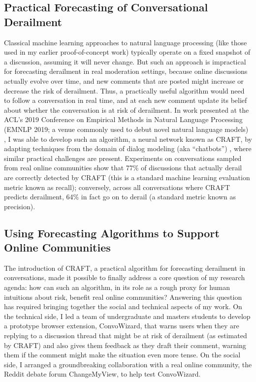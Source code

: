 \documentclass[11pt,letterpaper]{article}
\begin{document}
\subsection{Practical Forecasting of Conversational Derailment}
Classical machine learning approaches to natural language processing (like those used in my earlier proof-of-concept work) typically operate on a fixed snapshot of a discussion, assuming it will never change.
But such an approach is impractical for forecasting derailment in real moderation settings, because online discussions actually evolve over time, and new comments that are posted might increase or decrease the risk of derailment.
Thus, a practically useful algorithm would need to follow a conversation in real time, and at each new comment update its belief about whether the conversation is at risk of derailment.
In work presented at the ACL's 2019 Conference on Empirical Methods in Natural Language Processing (EMNLP 2019; a venue commonly used to debut novel natural language models) \cite{chang_trouble_2019}, I was able to develop such an algorithm, a neural network known as CRAFT, by adapting techniques from the domain of dialog modeling (aka ``chatbots'') \cite{serban_building_2016}, where similar practical challenges are present.
Experiments on conversations sampled from real online communities show that 77\% of discussions that actually derail are correctly detected by CRAFT (this is a standard machine learning evaluation metric known as recall); conversely, across all conversations where CRAFT predicts derailment, 64\% in fact go on to derail (a standard metric known as precision).

\subsection{Using Forecasting Algorithms to Support Online Communities}
The introduction of CRAFT, a practical algorithm for forecasting derailment in conversations, made it possible to finally address a core question of my research agenda: how can such an algorithm, in its role as a rough proxy for human intuitions about risk, benefit real online communities?
Answering this question has required bringing together the social and technical aspects of my work.
On the technical side, I led a team of undergraduate and masters students to develop a prototype browser extension, ConvoWizard, that warns users when they are replying to a discussion thread that might be at risk of derailment (as estimated by CRAFT) and also gives them feedback as they draft their comment, warning them if the comment might make the situation even more tense.
On the social side, I arranged a groundbreaking collaboration with a real online community, the Reddit debate forum ChangeMyView, to help test ConvoWizard.
\end{document}
